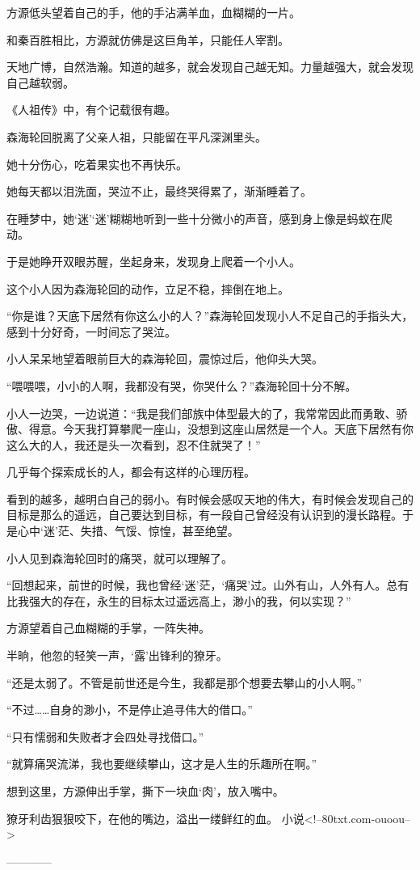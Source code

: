 \begin{this_body}
方源低头望着自己的手，他的手沾满羊血，血糊糊的一片。

和秦百胜相比，方源就仿佛是这巨角羊，只能任人宰割。

天地广博，自然浩瀚。知道的越多，就会发现自己越无知。力量越强大，就会发现自己越软弱。

《人祖传》中，有个记载很有趣。

森海轮回脱离了父亲人祖，只能留在平凡深渊里头。

她十分伤心，吃着果实也不再快乐。

她每天都以泪洗面，哭泣不止，最终哭得累了，渐渐睡着了。

在睡梦中，她‘迷’‘迷’糊糊地听到一些十分微小的声音，感到身上像是蚂蚁在爬动。

于是她睁开双眼苏醒，坐起身来，发现身上爬着一个小人。

这个小人因为森海轮回的动作，立足不稳，摔倒在地上。

“你是谁？天底下居然有你这么小的人？”森海轮回发现小人不足自己的手指头大，感到十分好奇，一时间忘了哭泣。

小人呆呆地望着眼前巨大的森海轮回，震惊过后，他仰头大哭。

“喂喂喂，小小的人啊，我都没有哭，你哭什么？”森海轮回十分不解。

小人一边哭，一边说道：“我是我们部族中体型最大的了，我常常因此而勇敢、骄傲、得意。今天我打算攀爬一座山，没想到这座山居然是一个人。天底下居然有你这么大的人，我还是头一次看到，忍不住就哭了！”

几乎每个探索成长的人，都会有这样的心理历程。

看到的越多，越明白自己的弱小。有时候会感叹天地的伟大，有时候会发现自己的目标是那么的遥远，自己要达到目标，有一段自己曾经没有认识到的漫长路程。于是心中‘迷’茫、失措、气馁、惊惶，甚至绝望。

小人见到森海轮回时的痛哭，就可以理解了。

“回想起来，前世的时候，我也曾经‘迷’茫，‘痛哭’过。山外有山，人外有人。总有比我强大的存在，永生的目标太过遥远高上，渺小的我，何以实现？”

方源望着自己血糊糊的手掌，一阵失神。

半晌，他忽的轻笑一声，‘露’出锋利的獠牙。

“还是太弱了。不管是前世还是今生，我都是那个想要去攀山的小人啊。”

“不过……自身的渺小，不是停止追寻伟大的借口。”

“只有懦弱和失败者才会四处寻找借口。”

“就算痛哭流涕，我也要继续攀山，这才是人生的乐趣所在啊。”

想到这里，方源伸出手掌，撕下一块血‘肉’，放入嘴中。

獠牙利齿狠狠咬下，在他的嘴边，溢出一缕鲜红的血。 小说<!--80txt.com-ouoou-->

------------

\end{this_body}

